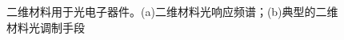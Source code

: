     \begin{figure}[htb]
        \caption{二维材料用于光电子器件。(a)二维材料光响应频谱；(b)典型的二维材料光调制手段}
        \label{fig:intro_2DM-optoelectronic}
    \end{figure}


